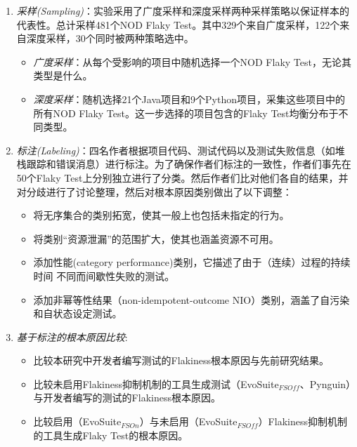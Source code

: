 \documentclass{article}
\newcommand{\flakyTest}{Flaky Test}
\begin{document}
\begin{enumerate}[label=(\arabic*),noitemsep]
    \item \textit{采样(Sampling)}：实验采用了广度采样和深度采样两种采样策略以保证样本的代表性。总计采样481个NOD \flakyTest 。其中329个来自广度采样，122个来自深度采样，30个同时被两种策略选中。
    
    \begin{itemize}[noitemsep]
        \item \textit{广度采样}：从每个受影响的项目中随机选择一个NOD \flakyTest，无论其类型是什么。
        \item \textit{深度采样}：随机选择21个Java项目和9个Python项目，采集这些项目中的所有NOD \flakyTest。这一步选择的项目包含的\flakyTest 均衡分布于不同类型。
    \end{itemize}

    \item \textit{标注(Labeling)}：四名作者根据项目代码、测试代码以及测试失败信息（如堆栈跟踪和错误消息）进行标注。为了确保作者们标注的一致性，作者们事先在50个\flakyTest 上分别独立进行了分类。然后作者们比对他们各自的结果，并对分歧进行了讨论整理，然后对根本原因类别做出了以下调整：
    
    \begin{itemize}[noitemsep]
        \item 将无序集合的类别拓宽，使其一般上也包括未指定的行为。
        \item 将类别“资源泄漏”的范围扩大，使其也涵盖资源不可用。
        \item 添加性能(category performance)类别，它描述了由于（连续）过程的持续时间 不同而间歇性失败的测试。
        \item 添加非幂等性结果（non-idempotent-outcome NIO）类别，涵盖了自污染和自状态设定测试。
    \end{itemize}

    \item \textit{基于标注的根本原因比较}:
    
    \begin{itemize}[noitemsep]
        \item 比较本研究中开发者编写测试的Flakiness根本原因与先前研究结果。
        \item 比较未启用Flakiness抑制机制的工具生成测试（EvoSuite${}_{FSOff}$、Pynguin）与开发者编写的测试的Flakiness根本原因。
        \item 比较启用（EvoSuite${}_{FSOn}$）与未启用（EvoSuite${}_{FSOff}$）Flakiness抑制机制的工具生成\flakyTest 的根本原因。
    \end{itemize}

\end{enumerate}
\end{document}
